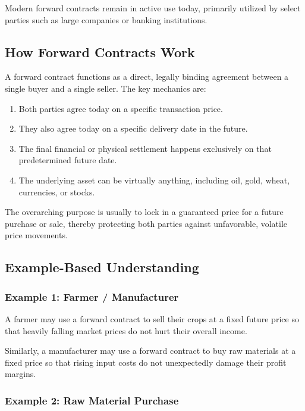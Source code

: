 \documentclass[12pt,openany]{book}
\begin{document}
Modern forward contracts remain in active use today, primarily utilized by select parties such as large companies or banking institutions.

\subsection{How Forward Contracts Work}

A forward contract functions as a direct, legally binding agreement between a single buyer and a single seller. The key mechanics are:

\begin{enumerate}[leftmargin=*]
    \item Both parties agree today on a specific transaction price.
    \item They also agree today on a specific delivery date in the future.
    \item The final financial or physical settlement happens exclusively on that predetermined future date.
    \item The underlying asset can be virtually anything, including oil, gold, wheat, currencies, or stocks.
\end{enumerate}

The overarching purpose is usually to lock in a guaranteed price for a future purchase or sale, thereby protecting both parties against unfavorable, volatile price movements.

\subsection{Example-Based Understanding}

\subsubsection{Example 1: Farmer / Manufacturer}

A farmer may use a forward contract to sell their crops at a fixed future price so that heavily falling market prices do not hurt their overall income.

Similarly, a manufacturer may use a forward contract to buy raw materials at a fixed price so that rising input costs do not unexpectedly damage their profit margins.

\subsubsection{Example 2: Raw Material Purchase}
\end{document}
